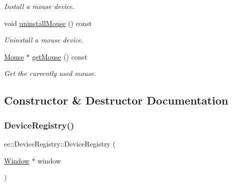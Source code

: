 \begin{DoxyCompactItemize}
\begin{DoxyCompactList}\small\item\em Install a mouse device. \end{DoxyCompactList}\item 
void \mbox{\hyperlink{classec_1_1_device_registry_a18bc5f140735a3f9abd453b89f472f2a}{uninstall\+Mouse}} () const
\begin{DoxyCompactList}\small\item\em Uninstall a mouse device. \end{DoxyCompactList}\item 
\mbox{\hyperlink{classec_1_1_mouse}{Mouse}} $\ast$ \mbox{\hyperlink{classec_1_1_device_registry_a53b0c5d23c851c63ef97529658cd126d}{get\+Mouse}} () const
\begin{DoxyCompactList}\small\item\em Get the currently used mouse. \end{DoxyCompactList}\end{DoxyCompactItemize}


\subsection{Constructor \& Destructor Documentation}
\mbox{\label{classec_1_1_device_registry_adbe0912caca04d8c401f58b57dc11524}} 
\subsubsection{\texorpdfstring{Device\+Registry()}{DeviceRegistry()}}
{\footnotesize\ttfamily ec\+::\+Device\+Registry\+::\+Device\+Registry (\begin{DoxyParamCaption}\item[{\mbox{\hyperlink{classec_1_1_window}{Window}} $\ast$}]{window }\end{DoxyParamCaption})\hspace{0.3cm}{\ttfamily [explicit]}}

\mbox{\label{classec_1_1_device_registry_a75dff0df1527fe9d7e75b25f3dff4028}} 
